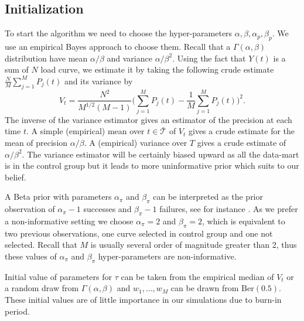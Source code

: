 \documentclass[journal]{IEEEtran}
\begin{document}
\subsection{Initialization}
To start the algorithm we need to choose the hyper-parameters
$\alpha,\beta,\alpha_p,\beta_p$. We use an empirical Bayes approach to
choose them. Recall that a $\Gamma(\alpha,\beta)$ distribution have
mean $\alpha/\beta$ and variance $\alpha/\beta^2$. Using the fact that
$Y(t)$ is a sum of $N$ load curve, we estimate it by taking the
following crude estimate $\frac{N}{M}\sum_{j=1}^{M}{P_j(t)}$ and its
variance by
$$V_t=\frac{N^2}{M^{1/2}(M-1)}\biggl(\sum_{j=1}^{M}{P_j(t)}-\frac{1}{M}\sum_{j=1}^{M}{P_j(t)}\biggr)^2.$$
The inverse of the variance estimator gives an estimator of the
precision at each time $t$. A simple (empirical) mean over
$t\in\bar{\mathcal{T}}$ of $V_t$ gives a crude estimate for the mean
of precision $\alpha/\beta$. A (empirical) variance over $T$ gives a
crude estimate of $\alpha/\beta^2$.  The variance estimator will be
certainly biased upward as all the data-mart is in the control group
but it leads to more uninformative prior which suits to our belief.

A Beta prior with parameters $\alpha_\pi$ and $\beta_\pi$ can be
interpreted as the prior observation of $\alpha_\pi-1$ successes and
$\beta_\pi-1$ failures, see for instance
\cite{bayesiandataanalysis}. As we prefer a non-informative setting we
choose $\alpha_\pi=2$ and $\beta_\pi=2$, which is equivalent to two
previous observations, one curve selected in control group and one not
selected. Recall that $M$ is usually several order of magnitude
greater than 2, thus these values of $\alpha_\pi$ and $\beta_\pi$
hyper-parameters are non-informative.

Initial value of parameters for $\tau$ can be taken from the empirical
median of $V_t$ or a random draw from $\Gamma(\alpha,\beta)$ and
$w_1,\dotsc,w_M$ can be drawn from $\mathrm{Ber}(0.5)$. These initial
values are of little importance in our simulations due to burn-in
period.
\end{document}
